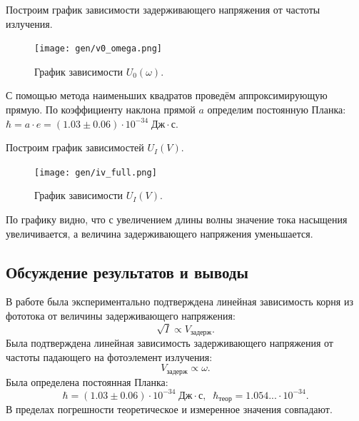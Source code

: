 \documentclass[10pt,a4paper]{article}
\begin{document}
	Построим график зависимости задерживающего напряжения от частоты излучения.			
	\begin{figure}[H]
		\centering
		\texttt{[image: gen/v0\_omega.png]}
		\caption{График зависимости $U_0 (\omega)$.}
	\end{figure}

	С помощью метода наименьших квадратов проведём аппроксимирующую прямую. По коэффициенту наклона прямой $a$ определим постоянную Планка:
	$\hbar = a \cdot e = (1.03 \pm 0.06) \cdot 10^{-34} \; Дж \cdot с.$
	
	Построим график зависимостей $U_I(V)$.
			
	\begin{figure}[H]
		\centering
		\texttt{[image: gen/iv\_full.png]}
		\caption{График зависимости $U_I (V)$.}
	\end{figure}
	
	По графику видно, что с увеличением длины волны значение тока насыщения увеличивается, а величина задерживающего напряжения уменьшается.
	
	\subsection*{Обсуждение результатов и выводы}
	
	В работе была экспериментально подтверждена линейная зависимость корня из фототока от величины задерживающего напряжения:
	$$
	\sqrt{I} \propto V_{задерж}.
	$$
	Была подтверждена линейная зависимость задерживающего напряжения от частоты падающего на фотоэлемент излучения:
	$$
	V_{задерж} \propto \omega.
	$$
	Была определена постоянная Планка:
	$$\hbar = (1.03 \pm 0.06) \cdot 10^{-34} \; Дж \cdot с ,\;\; \hbar_{теор} = 1.054...  \cdot 10^{-34}.$$
	В пределах погрешности теоретическое и измеренное значения совпадают.
	
	
\end{document}

